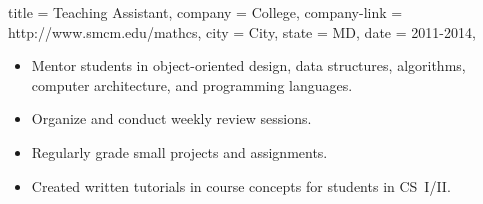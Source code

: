 \begin{position}
  {
    title   = Teaching Assistant,
    company = \StMarys College,
    company-link = http://www.smcm.edu/mathcs,
    city    = \StMarys City,
    state   = MD,
    date    = 2011-2014,
  }

\begin{itemize}
\item Mentor students in object-oriented design, data structures, algorithms, computer architecture, and programming languages.
\item Organize and conduct weekly review sessions.
\item Regularly grade small projects and assignments.
\item Created written tutorials in course concepts for students in CS~I\slash II.
\end{itemize}
\end{position}
